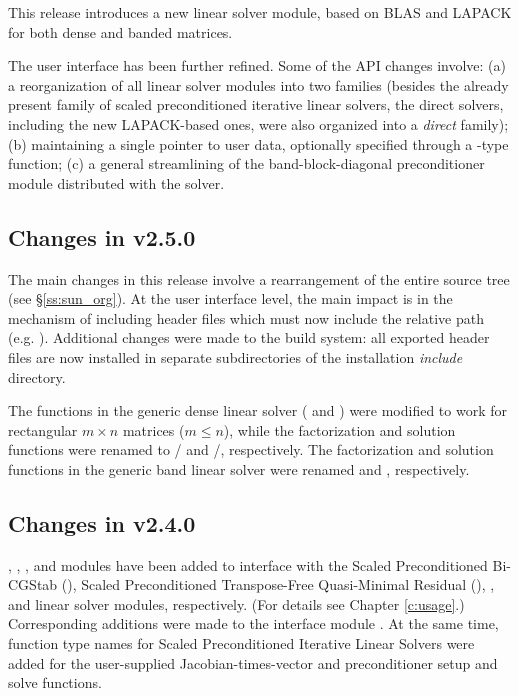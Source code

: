 This release introduces a new linear solver module, based on BLAS and LAPACK
for both dense and banded matrices.

The user interface has been further refined. Some of the API changes involve:
(a) a reorganization of all linear solver modules into two families (besides
the already present family of scaled preconditioned iterative linear solvers,
the direct solvers, including the new LAPACK-based ones, were also organized
into a {\em direct} family); (b) maintaining a single pointer to user data,
optionally specified through a -type function; (c) a general
streamlining of the band-block-diagonal preconditioner module distributed
with the solver.

\subsection*{Changes in v2.5.0}

The main changes in this release involve a rearrangement of the entire
{\sundials} source tree (see \S\ref{ss:sun_org}). At the user interface
level, the main impact is in the mechanism of including {\sundials} header
files which must now include the relative path (e.g. ).
Additional changes were made to the build system: all exported header files are
now installed in separate subdirectories of the installation {\em include} directory.

The functions in the generic dense linear solver ( and
) were modified to work for rectangular $m \times n$
matrices ($m \le n$), while the factorization and solution functions were
renamed to / and /,
respectively.
The factorization and solution functions in the generic band linear solver were
renamed  and , respectively.

\subsection*{Changes in v2.4.0}

{\kinspbcg}, {\kinsptfqmr}, {\kindense}, and {\kinband} modules have been
added to interface with the Scaled Preconditioned Bi-CGStab ({\spbcg}),
Scaled Preconditioned Transpose-Free Quasi-Minimal Residual ({\sptfqmr}),
{\dense}, and {\band} linear solver modules, respectively.  (For details
see Chapter \ref{c:usage}.) Corresponding additions were made to the {\F}
interface module {\fkinsol}. At the same time, function type names for
Scaled Preconditioned Iterative Linear Solvers were added for the
user-supplied Jacobian-times-vector and preconditioner setup and solve
functions.

